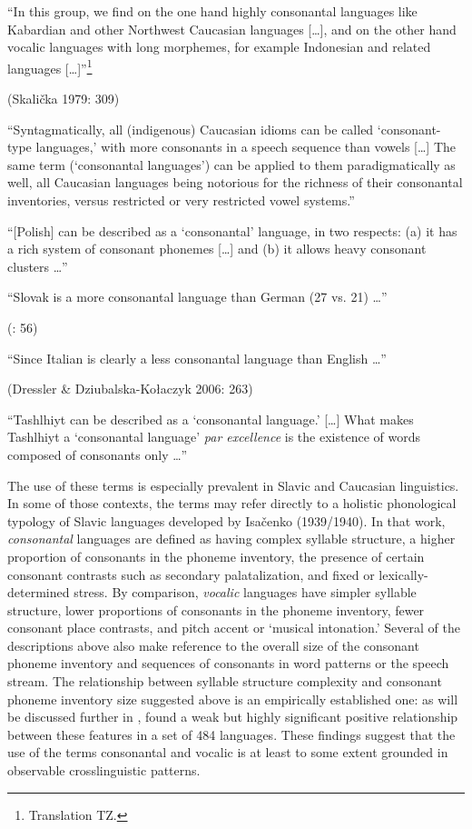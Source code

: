 \ea\label{ex:1.13}
   “In this group, we find on the one hand highly consonantal languages like Kabardian and other Northwest Caucasian languages […], and on the other hand vocalic languages with long morphemes, for example Indonesian and related languages […]”\footnote{{Translation TZ.}}

(Skalička 1979: 309)
\z

\ea\label{ex:1.14}
   “Syntagmatically, all (indigenous) Caucasian idioms can be called ‘consonant-type languages,’ with more consonants in a speech sequence than vowels […] The same term (‘consonantal languages’) can be applied to them paradigmatically as well, all Caucasian languages being notorious for the richness of their consonantal inventories, versus restricted or very restricted vowel systems.” 
\citep[43]{Chirikba2008}
\z

\ea\label{ex:1.15}
  “[Polish] can be described as a ‘consonantal’ language, in two respects: 
  (a) it has a rich system of consonant phonemes […] and (b) it allows heavy consonant clusters …” 
\citep[103]{Jassem2003}
\z

\ea\label{ex:1.16}
   “Slovak is a more consonantal language than German (27 vs. 21) …”

(\citealt{DresslerEtAl2015}: 56)
\z

\ea\label{ex:1.17}
  “Since Italian is clearly a less consonantal language than English …” 

(Dressler \& Dziubalska-Kołaczyk 2006: 263)
\z

\ea\label{ex:1.18}
  “Tashlhiyt can be described as a ‘consonantal language.’ […] What makes Tashlhiyt a ‘consonantal language’ \textit{par excellence} is the existence of words composed of consonants only …” 
\z
\citep[216]{Ridouane2014}

  The use of these terms is especially prevalent in Slavic and Caucasian linguistics. In some of those contexts, the terms may refer directly to a holistic phonological typology of Slavic languages developed by Isačenko (1939/1940). In that work, \textit{consonantal} languages are defined as having complex syllable structure, a higher proportion of consonants in the phoneme inventory, the presence of certain consonant contrasts such as secondary palatalization, and fixed or lexically-determined stress. By comparison, \textit{vocalic} languages have simpler syllable structure, lower proportions of consonants in the phoneme inventory, fewer consonant place contrasts, and pitch accent or ‘musical intonation.’ Several of the descriptions above also make reference to the overall size of the consonant phoneme inventory and sequences of consonants in word patterns or the speech stream. The relationship between syllable structure complexity and consonant phoneme inventory size suggested above is an empirically established one: as will be discussed further in , \citet{Maddieson2013a} found a weak but highly significant positive relationship between these features in a set of 484 languages. These findings suggest that the use of the terms consonantal and vocalic is at least to some extent grounded in observable crosslinguistic patterns.


